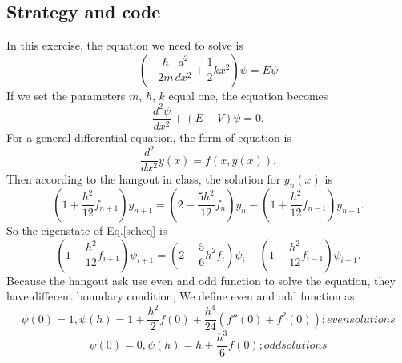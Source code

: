 \documentclass{article}
\begin{document}
\subsection{Strategy and code}
In this exercise, the equation we need to solve is 
\begin{equation}
\left( -\frac{\hbar}{2 m}\frac{d^2}{dx^2} + \frac{1}{2} k x^2 \right)\psi = E\psi
\end{equation}
If we set the parameters $m$, $\hbar$, $k$ equal one, the equation becomes
\begin{equation}\label{scheq}
\frac{d^2\psi}{dx^2} + \left( E - V \right)\psi = 0.
\end{equation}
For a general differential equation, the form of equation is 
\begin{equation}
\frac{d^2}{dx^2} y(x) =f (x, y(x)).
\end{equation}
Then according to the hangout in class, the solution for $y_n(x)$ is
\begin{equation}
\left(1+\frac{h^2}{12}f_{n+1}\right)y_{n+1} = \left(2 - \frac{5h^2}{12}f_n \right)y_n - \left(1 + \frac{h^2}{12}f_{n-1}\right)y_{n-1}.
\end{equation}
So the eigenstate of Eq.\ref{scheq} is
\begin{equation}\label{recur}
\left(1 - \frac{h^2}{12}f_{i+1}\right)\psi_{i+1} = \left(2 + \frac{5}{6} h^2 f_i \right)\psi_i - \left(1 - \frac{h^2}{12}f_{i-1}\right)\psi_{i-1}.
\end{equation}
Because the hangout ask use even and odd function to solve the equation, they have different boundary condition,
We define even and odd function as:
\begin{equation}
\psi(0) = 1, \psi(h) = 1 + \frac{h^2}{2}f(0) + \frac{h^4}{24}(f''(0) + f^2(0)) ; even solutions
\end{equation}
\begin{equation}
\psi(0) = 0, \psi(h) = h + \frac{h^3}{6}f(0) ;  odd solutions
\end{equation}
\end{document}

